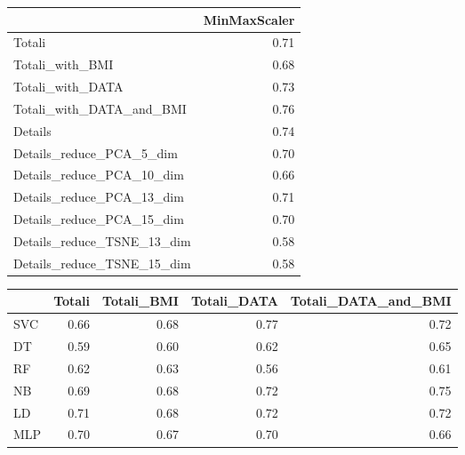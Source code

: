 \documentclass[12pt,italian]{report}
\begin{document}
\begin{table}[h]
	\begin{center}
		\begin{adjustbox}{max width=\textwidth}
			\begin{tabular}{lr}
				\toprule
				{} &  MinMaxScaler \\
				\midrule
				Totali                     &      0.71 \\
				Totali\_with\_BMI            &      0.68 \\
				Totali\_with\_DATA           &      0.73 \\
				Totali\_with\_DATA\_and\_BMI   &      \cellcolor{orange}0.76 \\
				Details                    &      0.74 \\
				Details\_reduce\_PCA\_5\_dim   &      0.70 \\
				Details\_reduce\_PCA\_10\_dim  &      0.66 \\
				Details\_reduce\_PCA\_13\_dim  &      0.71 \\
				Details\_reduce\_PCA\_15\_dim  &      0.70 \\
				Details\_reduce\_TSNE\_13\_dim &      0.58 \\
				Details\_reduce\_TSNE\_15\_dim &      0.58 \\
				\bottomrule
			\end{tabular}
		\end{adjustbox}
	\end{center}
\end{table}

\begin{table}[h]
	\begin{center}
		\begin{adjustbox}{max width=\textwidth}
			\begin{tabular}{lrrrr}
				\toprule
				{} &    Totali &  Totali\_BMI &  Totali\_DATA &  Totali\_DATA\_and\_BMI \\
				\midrule
				SVC &  0.66 &         0.68 &          \cellcolor{orange}0.77 &                  0.72 \\
				DT  &  0.59 &         0.60 &          0.62 &                  0.65 \\
				RF  &  0.62 &         0.63 &          0.56 &                  0.61 \\
				NB  &  0.69 &         0.68 &          0.72 &                  \cellcolor{cyan}0.75 \\
				LD  &  0.71 &         0.68 &          \cellcolor{cyan}0.72 &                  0.72 \\
				MLP &  0.70 &         0.67 &          \cellcolor{cyan}0.70 &                  0.66 \\
				\bottomrule
			\end{tabular}
		\end{adjustbox}
	\end{center}
\end{table}
\end{document}
